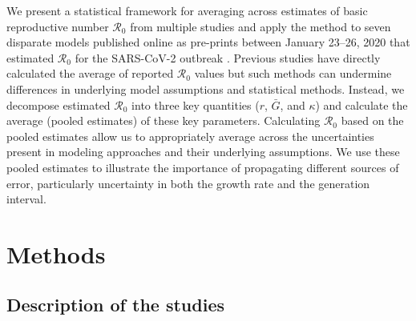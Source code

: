 \documentclass[12pt]{article}
\newcommand{\Ro}{\ensuremath{{\mathcal R}_{0}}\xspace}
\begin{document}
We present a statistical framework for averaging across estimates of basic reproductive number \Ro from multiple studies and apply the method to seven disparate models published online as pre-prints between January 23--26, 2020 that estimated \Ro for the SARS-CoV-2 outbreak \citep{bedfordncov, imaincov, liuncov, majumderncov, readncov, riouncov, zhaoncov}.
Previous studies have directly calculated the average of reported \Ro values  \citep{majumder2020early, liu2020reproductive} but such methods can undermine differences in underlying model assumptions and statistical methods.
Instead, we decompose estimated \Ro into three key quantities ($r$, $\bar G$, and $\kappa$) and calculate the average (pooled estimates) of these key parameters.
Calculating \Ro based on the pooled estimates allow us to appropriately average across the uncertainties present in modeling approaches and their underlying assumptions.
We use these pooled estimates to illustrate the importance of propagating different sources of error, particularly uncertainty in both the growth rate and the generation interval.

\section{Methods}

\subsection{Description of the studies}
\end{document}
